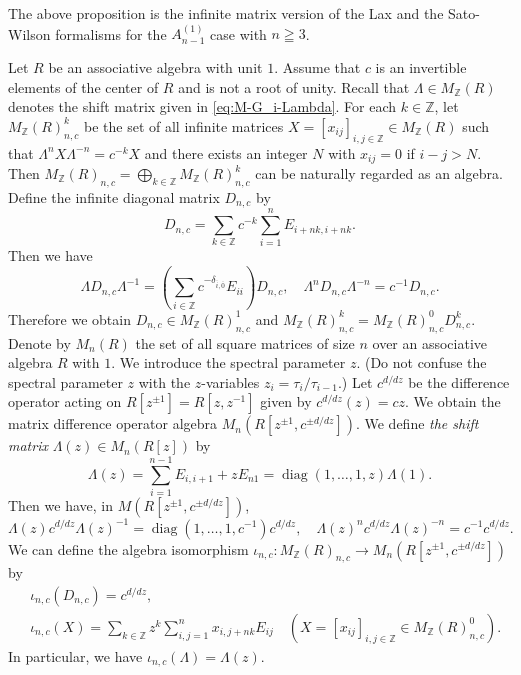 \documentclass[12pt,twoside]{article}
\newcommand\diag{\mathop{\mathrm{diag}}\nolimits}
\newcommand\Z{{\mathbb Z}} %
\theoremstyle{plain} %
\theoremstyle{definition} %
\theoremstyle{definition} %
\numberwithin{theorem}{section}
\numberwithin{equation}{section}
\numberwithin{figure}{section}
\numberwithin{table}{section}
\begin{document}
The above proposition is
the infinite matrix version of  
the Lax and the Sato-Wilson formalisms for the $A^{(1)}_{n-1}$ case
with $n\geqq 3$.

Let $R$ be an associative algebra with unit $1$.
Assume that $c$ is an invertible elements of the center of $R$
and is not a root of unity.
Recall that $\Lambda\in M_\Z(R)$ denotes 
the shift matrix given in \eqref{eq:M-G_i-Lambda}.
For each $k\in\Z$, let $M_\Z(R)_{n,c}^k$ be the set of 
all infinite matrices $X=[x_{ij}]_{i,j\in\Z}\in M_\Z(R)$ such that
$\Lambda^n X \Lambda^{-n}=c^{-k} X$ and
there exists an integer $N$ with $x_{ij}=0$ if $i-j>N$.
Then $M_\Z(R)_{n,c} = \bigoplus_{k\in\Z}M_\Z(R)_{n,c}^k$ can be 
naturally regarded as an algebra.
Define the infinite diagonal matrix $D_{n,c}$ by 
\begin{equation*}
 D_{n,c} = \sum_{k\in\Z} c^{-k} \sum_{i=1}^n E_{i+nk,i+nk}.
\end{equation*}
Then we have
\begin{equation*}
 \Lambda D_{n,c} \Lambda^{-1} =  
 \left(
  \sum_{i\in\Z} c^{-\delta_{\overline{i},\overline{0}}} E_{ii}
 \right) D_{n,c},
 \quad
 \Lambda^n D_{n,c} \Lambda^{-n} = c^{-1} D_{n,c}.
\end{equation*}
Therefore we obtain $D_{n,c}\in M_\Z(R)_{n,c}^1$ 
and $M_\Z(R)_{n,c}^k = M_\Z(R)_{n,c}^0 D_{n,c}^k$.
%
Denote by $M_n(R)$ the set of all square matrices of size $n$ 
over an associative algebra $R$ with $1$.
We introduce the spectral parameter $z$.
(Do not confuse the spectral parameter $z$ 
with the $z$-variables $z_i=\tau_i/\tau_{i-1}$.)
Let $c^{d/dz}$ be the difference operator acting 
on $R[z^{\pm1}]=R[z,z^{-1}]$ given by $c^{d/dz}(z)=cz$.
We obtain the matrix difference operator algebra 
$M_n(R[z^{\pm1},c^{\pm d/dz}])$.
We define {\em the shift matrix} $\Lambda(z)\in M_n(R[z])$ by
\begin{equation*}
 \Lambda(z) 
 = \sum_{i=1}^{n-1} E_{i,i+1} + z E_{n1}
 = \diag(1,\ldots,1,z) \Lambda(1).
\end{equation*}
Then we have, in $M(R[z^{\pm1},c^{\pm d/dz}])$, 
\begin{equation*}
 \Lambda(z) c^{d/dz} \Lambda(z)^{-1} = \diag(1,\ldots,1,c^{-1})c^{d/dz}, \quad
 \Lambda(z)^n c^{d/dz} \Lambda(z)^{-n} = c^{-1} c^{d/dz}.
\end{equation*}
We can define the algebra isomorphism 
$\iota_{n,c} : M_\Z(R)_{n,c}\to M_n(R[z^{\pm1},c^{\pm d/dz}])$ by
\begin{align*}
 &
 \iota_{n,c}(D_{n,c}) = c^{d/dz}, \quad
 \\ &
 \iota_{n,c}(X) 
 = \sum_{k\in\Z} z^k \sum_{i,j=1}^n x_{i,j+nk} E_{ij}
 \quad (X=[x_{ij}]_{i,j\in\Z}\in M_\Z(R)_{n,c}^0).
\end{align*}
In particular, we have $\iota_{n,c}(\Lambda)=\Lambda(z)$.
\end{document}
